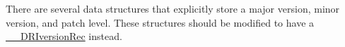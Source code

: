 
\begin{DoxyRefList}
\item[\label{todo__todo000001}%
\hypertarget{todo__todo000001}{}%
Classe \hyperlink{struct_____d_r_iversion_rec}{\-\_\-\-\_\-\-D\-R\-Iversion\-Rec} ]There are several data structures that explicitly store a major version, minor version, and patch level. These structures should be modified to have a {\ttfamily \hyperlink{struct_____d_r_iversion_rec}{\-\_\-\-\_\-\-D\-R\-Iversion\-Rec}} instead. 
\end{DoxyRefList}